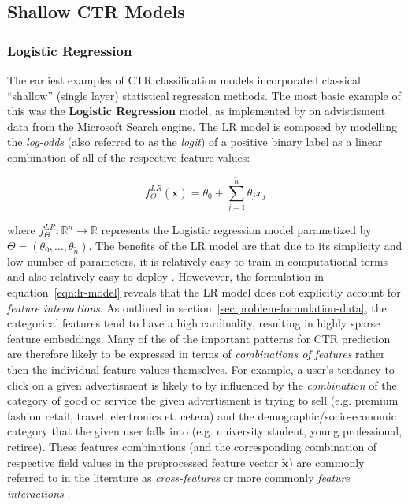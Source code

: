 \documentclass{mldsmsc}
\begin{document}
\subsection{Shallow CTR Models}
\label{sec:shallow-models}

\subsubsection{Logistic Regression}

The earliest examples of CTR classification models incorporated classical ``shallow'' 
(single layer) statistical regression methods. The most basic example of this was 
the \textbf{Logistic Regression} model, as implemented by \cite{RefWorks:richardson2007predicting} on
advistisment data from the Microsoft Search engine. The LR model
is composed by modelling the \emph{log-odds} (also referred to as the \emph{logit}) 
of a positive binary label as a linear combination
of all of the respective feature values:

\begin{equation}
\label{eqn:lr-model}
f_{\Theta}^{LR}(\tilde{\mathbf{x}}) = \theta_0 + \sum_{j=1}^{\tilde{n}}\theta_j \tilde{x}_j
\end{equation}

where $f_{\Theta}^{LR}: \mathbb{R}^n \rightarrow \mathbb{R}$ represents the Logistic regression
model parametized by $\Theta = (\theta_0, \ldots, \theta_{\tilde{n}})$. The benefits of the LR
model are that due to its simplicity and low number of parameters, it is relatively easy to
train in computational terms and also relatively easy to deploy \citep{RefWorks:zhang2021deep}.
Howevever, the formulation in equation~\ref{eqn:lr-model} reveals that the LR model does not explicitly 
account for \emph{feature interactions}.
As outlined in section~\ref{sec:problem-formulation-data}, the categorical features tend to have a
high cardinality, resulting in highly sparse feature embeddings. Many of the of the important patterns
for CTR prediction are therefore likely to be expressed in terms of \emph{combinations of features}
rather then the individual feature values themselves. For example, a user's tendancy to
click on a given advertisment is likely to by influenced by the \emph{combination} of the category
of good or service the given advertisment is trying to sell (e.g. premium fashion retail, travel, electronics et. cetera)
and the demographic/socio-economic category that the given user falls into (e.g. university student, young professional, retiree).
These features combinations (and the corresponding combination of respective field values 
in the preprocessed feature vector $\tilde{\mathbf{x}}$) are commonly referred to in
the literature as \emph{cross-features} \citep{RefWorks:zhang2023memonet:} or more commonly
\emph{feature interactions} \citep{RefWorks:cheng2016wide,RefWorks:xiao2017attentional,RefWorks:song2019autoint}.
\end{document}
